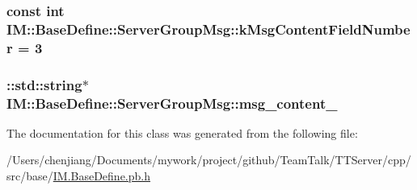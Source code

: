 \subsubsection[{k\+Msg\+Content\+Field\+Number}]{\setlength{\rightskip}{0pt plus 5cm}const int I\+M\+::\+Base\+Define\+::\+Server\+Group\+Msg\+::k\+Msg\+Content\+Field\+Number = 3\hspace{0.3cm}{\ttfamily [static]}}\label{class_i_m_1_1_base_define_1_1_server_group_msg_a2d629baf7c304f6e5cf912cb2fc8c874}
\hypertarget{class_i_m_1_1_base_define_1_1_server_group_msg_afdf988e46077693a90f3f6901352253a}{}
\subsubsection[{msg\+\_\+content\+\_\+}]{\setlength{\rightskip}{0pt plus 5cm}\+::std\+::string$\ast$ I\+M\+::\+Base\+Define\+::\+Server\+Group\+Msg\+::msg\+\_\+content\+\_\+\hspace{0.3cm}{\ttfamily [private]}}\label{class_i_m_1_1_base_define_1_1_server_group_msg_afdf988e46077693a90f3f6901352253a}


The documentation for this class was generated from the following file\+:\begin{DoxyCompactItemize}
\item 
/\+Users/chenjiang/\+Documents/mywork/project/github/\+Team\+Talk/\+T\+T\+Server/cpp/src/base/\hyperlink{_i_m_8_base_define_8pb_8h}{I\+M.\+Base\+Define.\+pb.\+h}\end{DoxyCompactItemize}
